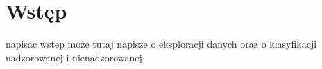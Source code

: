 \chapter*{Wstęp}
napisac wstep
może tutaj napisze o eksploracji danych oraz o klasyfikacji nadzorowanej i nienadzorowanej